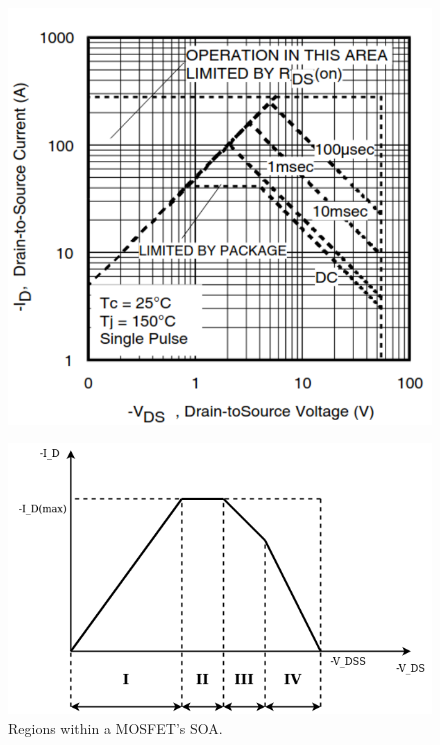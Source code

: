 \documentclass[../main.tex]{subfiles}
\begin{document}
    \begin{figure}[!h]
        \centering
        \begin{minipage}{.5\textwidth}
          \centering
          \includegraphics[width=0.8\linewidth]{media/typical_SOA_plot.png}
          \label{fig:typical_SOA_plot}
        \end{minipage}%
        \begin{minipage}{.5\textwidth}
          \centering
          \includegraphics[width=\linewidth]{media/SOA_regions.drawio.png}
          \caption{Regions within a MOSFET's SOA.}
        \label{fig:SOA_regions}
        \end{minipage}
    \end{figure}
\end{document}
